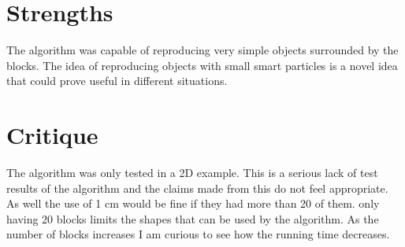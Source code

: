 \documentclass{article}
\begin{document}
\section*{Strengths}
The algorithm was capable of reproducing very simple objects surrounded by the blocks. The idea of reproducing objects with small smart particles is a novel idea that could prove useful in different situations.
\section*{Critique}
The algorithm was only tested in a 2D example. This is a serious lack of test results of the algorithm and the claims made from this do not feel appropriate. As well the use of 1 cm would be fine if they had more than 20 of them. only having 20 blocks limits the shapes that can be used by the algorithm. As the number of blocks increases I am curious to see how the running time decreases.
\cite{ref}
\end{document}
